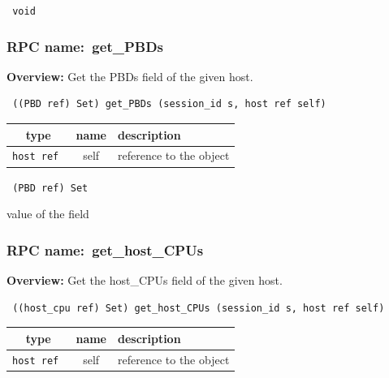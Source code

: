 \vspace{0.3cm}

{\tt 
void
}



\vspace{0.3cm}
\vspace{0.3cm}
\vspace{0.3cm}
\subsubsection{RPC name:~get\_PBDs}

{\bf Overview:} 
Get the PBDs field of the given host.

\begin{verbatim} ((PBD ref) Set) get_PBDs (session_id s, host ref self)\end{verbatim}



 
\vspace{0.3cm}
\begin{tabular}{|c|c|p{7cm}|}
 \hline
{\bf type} & {\bf name} & {\bf description} \\ \hline
{\tt host ref } & self & reference to the object \\ \hline 

\end{tabular}

\vspace{0.3cm}

{\tt 
(PBD ref) Set
}


value of the field
\vspace{0.3cm}
\vspace{0.3cm}
\vspace{0.3cm}
\subsubsection{RPC name:~get\_host\_CPUs}

{\bf Overview:} 
Get the host\_CPUs field of the given host.

\begin{verbatim} ((host_cpu ref) Set) get_host_CPUs (session_id s, host ref self)\end{verbatim}



 
\vspace{0.3cm}
\begin{tabular}{|c|c|p{7cm}|}
 \hline
{\bf type} & {\bf name} & {\bf description} \\ \hline
{\tt host ref } & self & reference to the object \\ \hline 

\end{tabular}

